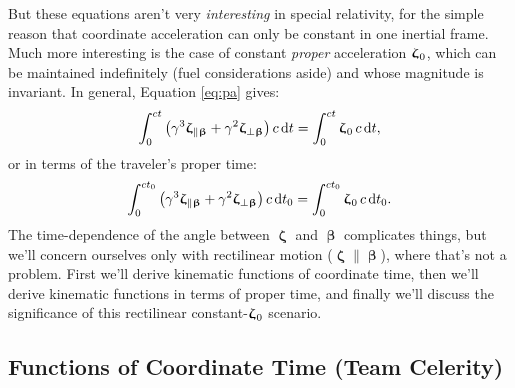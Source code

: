 \documentclass[12pt]{article}
\newcommand{\dd}[1]{\mathrm{d}#1}
\newcommand{\vvbeta}{\bm{\upbeta}}
\newcommand{\vvzeta}{\bm{\upzeta}}
\begin{document}
But these equations aren't very \emph{interesting} in special relativity, for the simple reason that coordinate acceleration can only be constant in one inertial frame. Much more interesting is the case of constant \emph{proper} acceleration $\vvzeta_{\mkern1mu 0}$, which can be maintained indefinitely (fuel considerations aside) and whose magnitude is invariant. In general, Equation \ref{eq:pa} gives:
\begin{equation*}
\int_0^{ct} \left( \gamma^3 \vvzeta_{\parallel \vvbeta} + \gamma^2 \vvzeta_{\perp \vvbeta} \right) c \, \dd t = \int_0^{ct} \vvzeta_{\mkern1mu 0} \, c \, \dd t ,
\end{equation*}
or in terms of the traveler's proper time:
\begin{equation*}
\int_0^{ct_0} \left( \gamma^3 \vvzeta_{\parallel \vvbeta} + \gamma^2 \vvzeta_{\perp \vvbeta} \right) c \, \dd t_0 = \int_0^{ct_0} \vvzeta_{\mkern1mu 0} \, c \, \dd t_0 .
\end{equation*}
The time-dependence of the angle between $\vvzeta$ and $\vvbeta$ complicates things, but we'll concern ourselves only with rectilinear motion ($\vvzeta \parallel \vvbeta$), where that's not a problem. First we'll derive kinematic functions of coordinate time, then we'll derive kinematic functions in terms of proper time, and finally we'll discuss the significance of this rectilinear constant-$\vvzeta_{\mkern1mu 0}$ scenario.


\subsection{Functions of Coordinate Time (Team Celerity)}
\end{document}
